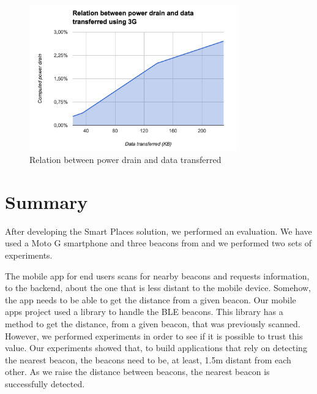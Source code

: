 \begin{figure}[!ht]
  \centering
    \includegraphics[width=0.8\textwidth, keepaspectratio]{images/results_battery_data}
    \caption[Power drain vs Data transferred]{Relation between power drain and data transferred}
    \label{fig:results_battery_data}
\end{figure}

\section{Summary}
\label{sec:evaluation_summary}
After developing the Smart Places solution, we performed an evaluation.
We have used a  Moto G smartphone and three beacons from  and we performed two sets of experiments.

The mobile app for end users scans for nearby beacons and requests information, to the backend, about the one that is less distant to the mobile device.
Somehow, the app needs to be able to get the distance from a given beacon.
Our mobile apps project used a library to handle the \gls{BLE} beacons. This library has a method to get the distance, from a given beacon, that was previously scanned.
However, we performed experiments in order to see if it is possible to trust this value.
Our experiments showed that, to build applications that rely on detecting the nearest beacon, the beacons need to be, at least, 1.5m distant from each other.
As we raise the distance between beacons, the nearest beacon is successfully detected.

